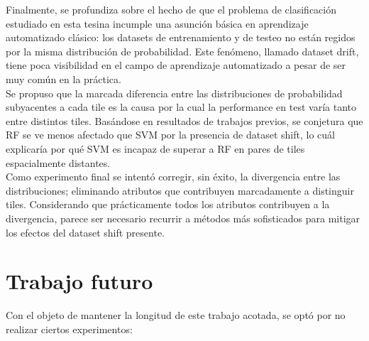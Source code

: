 Finalmente, se profundiza sobre el hecho de que el problema de clasificación estudiado en esta tesina incumple una asunción básica en aprendizaje automatizado clásico: los datasets de entrenamiento y de testeo no están regidos por la misma distribución de probabilidad. Este fenómeno, llamado dataset drift, tiene poca visibilidad en el campo de aprendizaje automatizado a pesar de ser muy común en la práctica. \\

Se propuso que la marcada diferencia entre las distribuciones de probabilidad subyacentes a cada tile es la causa por la cual la performance en test varía tanto entre distintos tiles. Basándose en resultados de trabajos previos, se conjetura que RF se ve menos afectado que SVM por la presencia de dataset shift, lo cuál explicaría por qué SVM es incapaz de superar a RF en pares de tiles espacialmente distantes. \\


Como experimento final se intentó corregir, sin éxito, la divergencia entre las distribuciones; eliminando atributos que contribuyen marcadamente a distinguir tiles. Considerando que prácticamente todos los atributos contribuyen a la divergencia, parece ser necesario recurrir a métodos más sofisticados para mitigar los efectos del dataset shift presente. \\

\section{Trabajo futuro}
\label{tfuturo}
Con el objeto de mantener la longitud de este trabajo acotada, se optó por no realizar ciertos experimentos: 

